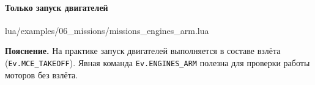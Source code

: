 \paragraph{Только запуск двигателей}
\begin{codefile}{lua/examples/06_missions/missions_engines_arm.lua}
\end{codefile}
\textbf{Пояснение.} На практике запуск двигателей выполняется в составе взлёта (\texttt{Ev.MCE\_TAKEOFF}). Явная команда \texttt{Ev.ENGINES\_ARM} полезна для проверки работы моторов без взлёта.
